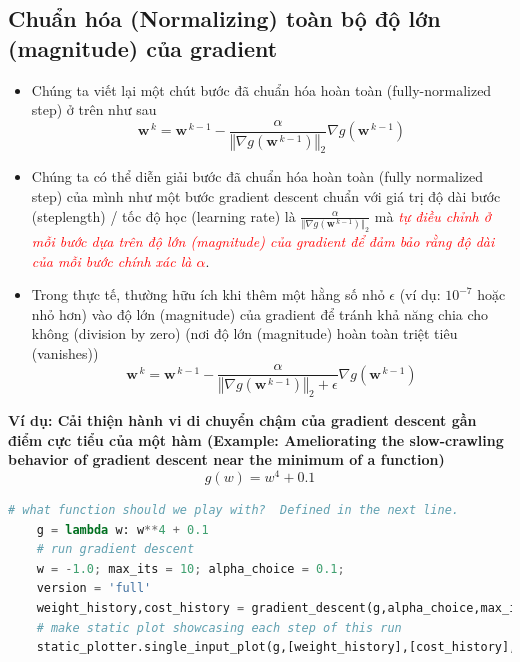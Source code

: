 \documentclass{book}
\begin{document}
\subsection{Chuẩn hóa (Normalizing) toàn bộ độ lớn (magnitude) của gradient}
\begin{itemize}
    \item Chúng ta viết lại một chút bước đã chuẩn hóa hoàn toàn (fully-normalized step) ở trên như sau
    \begin{equation*}
        \mathbf{w}^{\,k} = \mathbf{w}^{\,k-1} - \frac{\alpha}{{\left\Vert \nabla g(\mathbf{w}^{\,k-1}) \right\Vert_2 }} \nabla g(\mathbf{w}^{\,k-1})
    \end{equation*}
    \item Chúng ta có thể diễn giải bước đã chuẩn hóa hoàn toàn (fully normalized step) của mình như một bước gradient descent chuẩn với giá trị độ dài bước (steplength) / tốc độ học (learning rate) là $\frac{\alpha}{{\left\Vert \nabla g(\mathbf{w}^{\,k-1}) \right\Vert_2 }}$ mà \textit{\textcolor{red}{tự điều chỉnh ở mỗi bước dựa trên độ lớn (magnitude) của gradient để đảm bảo rằng độ dài của mỗi bước chính xác là $\alpha$}}.
    \item Trong thực tế, thường hữu ích khi thêm một hằng số nhỏ $\epsilon$ (ví dụ: $10^{-7}$ hoặc nhỏ hơn) vào độ lớn (magnitude) của gradient để tránh khả năng chia cho không (division by zero) (nơi độ lớn (magnitude) hoàn toàn triệt tiêu (vanishes))
    \begin{equation}
        \mathbf{w}^{\,k} = \mathbf{w}^{\,k-1} - \frac{\alpha}{{\left\Vert \nabla g(\mathbf{w}^{\,k-1}) \right\Vert_2 } + \epsilon} \nabla g(\mathbf{w}^{\,k-1})
    \end{equation}

\end{itemize}
\textbf{Ví dụ: Cải thiện hành vi di chuyển chậm của gradient descent gần điểm cực tiểu của một hàm (Example: Ameliorating the slow-crawling behavior of gradient descent near the minimum of a function)}
\begin{equation*}
    g(w) = w^4 + 0.1
\end{equation*}
\begin{lstlisting}[language=Python, caption={Đoạn mã Python thực thi Gradient Descent (phiên bản 'full') và minh họa các bước thực hiện cho hàm $g(w) = w^4 + 0.1$.}, label={code:matplotlib_plot_norm_1}]
    # what function should we play with?  Defined in the next line.
    g = lambda w: w**4 + 0.1
    # run gradient descent 
    w = -1.0; max_its = 10; alpha_choice = 0.1;
    version = 'full'
    weight_history,cost_history = gradient_descent(g,alpha_choice,max_its,w,version)
    # make static plot showcasing each step of this run
    static_plotter.single_input_plot(g,[weight_history],[cost_history],wmin = -1.1,wmax = 1.1)
\end{lstlisting}
\end{document}
